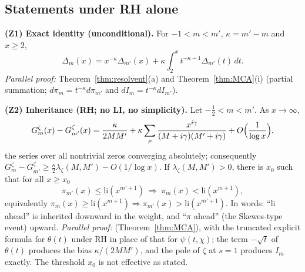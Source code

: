 \documentclass[11pt]{amsart}
\theoremstyle{definition}
\numberwithin{equation}{section}
\begin{document}
\subsection{Statements under RH alone}

\noindent\textbf{(Z1) Exact identity (unconditional).} For
$-1<m<m'$, $\kappa=m'-m$ and $x\ge2$,
\[
\Delta_m(x)=x^{-\kappa}\Delta_{m'}(x)
+\kappa\int_2^xt^{-\kappa-1}\Delta_{m'}(t)\,dt .
\]
\emph{Parallel proof:} Theorem~\ref{thm:resolvent}(a) and
Theorem~\ref{thm:MCA}(i) (partial summation;
$d\pi_m=t^{-\kappa}d\pi_{m'}$ and $dI_m=t^{-\kappa}dI_{m'}$).

\smallskip\noindent\textbf{(Z2) Inheritance (RH; no LI, no
simplicity).} Let $-\tfrac12<m<m'$. As $x\to\infty$,
\[
G^\zeta_m(x)-G^\zeta_{m'}(x)=\frac{\kappa}{2MM'}
+\kappa\sum_\rho\frac{x^{i\gamma}}{(M+i\gamma)(M'+i\gamma)}
+O\Bigl(\frac1{\log x}\Bigr),
\]
the series over all nontrivial zeros converging absolutely;
consequently
$G^\zeta_m-G^\zeta_{m'}\ge\tfrac\kappa2\lambda_\zeta(M,M')-O(1/\log x)$.
If $\lambda_\zeta(M,M')>0$, there is $x_0$ such that for all
$x\ge x_0$
\[
\pi_{m'}(x)\le\mathrm{li}(x^{m'+1})\ \Longrightarrow\
\pi_m(x)<\mathrm{li}(x^{m+1}),
\]
equivalently
$\pi_m(x)\ge\mathrm{li}(x^{m+1})\Rightarrow
\pi_{m'}(x)>\mathrm{li}(x^{m'+1})$. In words: ``$\mathrm{li}$ ahead''
is inherited downward in the weight, and ``$\pi$ ahead'' (the
Skewes-type event) upward. \emph{Parallel proof:}
\cite[Theorem~A]{MC} (Theorem~\ref{thm:MCA}), with the truncated
explicit formula for $\theta(t)$ under RH in place of that for
$\psi(t,\chi)$; the term $-\sqrt t$ of $\theta(t)$ produces the bias
$\kappa/(2MM')$, and the pole of $\zeta$ at $s=1$ produces $I_m$
exactly. The threshold $x_0$ is not effective as stated.
\end{document}
